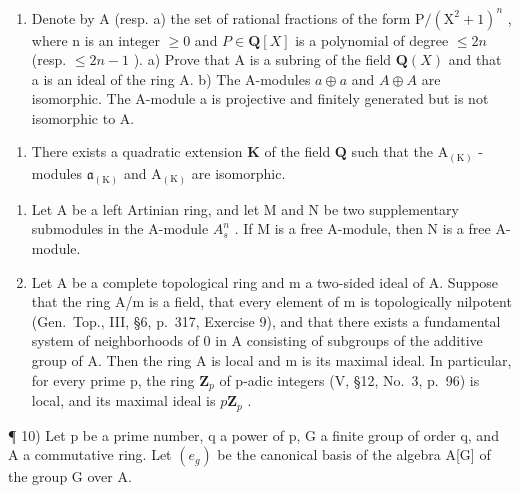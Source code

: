 \begin{enumerate}
\def\labelenumi{\arabic{enumi})}
\setcounter{enumi}{6}
\tightlist
\item
  Denote by A (resp. a) the set of rational fractions of the form \(\mathrm{P}/(\mathrm{X}^{2}+1)^{n}\) , where n is an integer \(\geqslant0\) and \(P\in \mathbf{Q}[X]\) is a polynomial of degree \(\leqslant2n\) (resp. \(\leqslant2n-1\) ). a) Prove that A is a subring of the field \(\mathbf{Q}(X)\) and that a is an ideal of the ring A. b) The A-modules \(a\oplus a\) and \(A\oplus A\) are isomorphic. The A-module a is projective and finitely generated but is not isomorphic to A.
\end{enumerate}

\begin{enumerate}
\def\labelenumi{\alph{enumi})}
\setcounter{enumi}{2}
\tightlist
\item
  There exists a quadratic extension \(\mathbf{K}\) of the field \(\mathbf{Q}\) such that the \(\mathrm{A}_{(\mathrm{K})}\) -modules \(\mathfrak{a}_{(\mathrm{K})}\) and \(\mathrm{A}_{(\mathrm{K})}\) are isomorphic.
\end{enumerate}

\begin{enumerate}
\def\labelenumi{\arabic{enumi})}
\setcounter{enumi}{7}
\item
  Let A be a left Artinian ring, and let M and N be two supplementary submodules in the A-module \(A_{s}^{n}\) . If M is a free A-module, then N is a free A-module.
\item
  Let A be a complete topological ring and m a two-sided ideal of A. Suppose that the ring A/m is a field, that every element of m is topologically nilpotent (Gen.~Top., III, §6, p.~317, Exercise 9), and that there exists a fundamental system of neighborhoods of 0 in A consisting of subgroups of the additive group of A. Then the ring A is local and m is its maximal ideal. In particular, for every prime p, the ring \(\mathbf{Z}_{p}\) of p-adic integers (V, §12, No.~3, p.~96) is local, and its maximal ideal is \(p\mathbf{Z}_{p}\) .
\end{enumerate}

¶ 10) Let p be a prime number, q a power of p, G a finite group of order q, and A a commutative ring. Let \((e_{g})\) be the canonical basis of the algebra A{[}G{]} of the group G over A.

